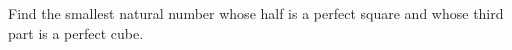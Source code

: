 Find the smallest natural number whose half is a perfect square and whose third part is a perfect cube.
